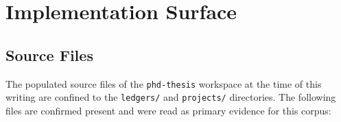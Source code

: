 
\section{Implementation Surface}
\label{sec:phd-thesis-impl}

\subsection{Source Files}
\label{sec:phd-thesis-impl-sources}

The populated source files of the \texttt{phd-thesis} workspace at the time of this writing
are confined to the \texttt{ledgers/} and \texttt{projects/} directories. The following
files are confirmed present and were read as primary evidence for this corpus:

